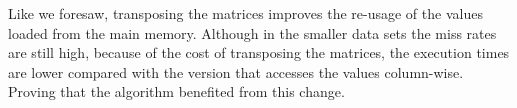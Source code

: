 \documentclass[twoside,twocolumn]{article}
\begin{document}
\begin{table}[ht]
\centering
{}
\caption{Miss rates of the \textbf{IJK} implementation.}
\label{tab:missrates}
\end{table}

Like we foresaw, transposing the matrices improves the re-usage of the values loaded from the main memory. Although in the smaller data sets the miss rates are still high, because of the cost of transposing the matrices, the execution times are lower compared with the version that accesses the values column-wise. Proving that the algorithm benefited from this change.
\end{document}
